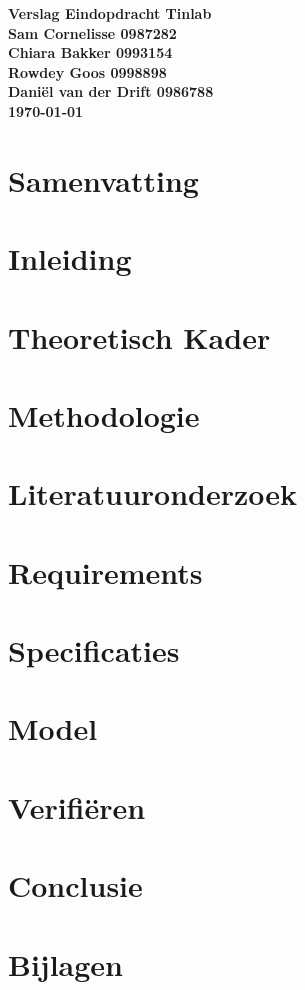 \documentclass{article}
\begin{document}
\sffamily
\begin{titlepage}
  \centering
    \vfill
    {\bfseries\Huge
      Verslag Eindopdracht Tinlab \\
        \vskip2cm
      }
      {\bfseries\Large
        Sam Cornelisse 0987282\\
	Chiara Bakker 0993154\\
	Rowdey Goos 0998898\\
	Daniël van der Drift 0986788\\
      }
      {
        \bfseries\normalsize
        \vskip1cm
        \today\\
    }
    \vfill
    \vfill
    \vfill
\end{titlepage}
\newpage
\tableofcontents

\newpage
\section{Samenvatting}


\section{Inleiding}


\section{Theoretisch Kader}


\section{Methodologie}


\section{Literatuuronderzoek}


\section{Requirements}


\section{Specificaties}


\section{Model}


\section{Verifiëren}


\section{Conclusie}


\newpage
\section{Bijlagen}


\end{document}
